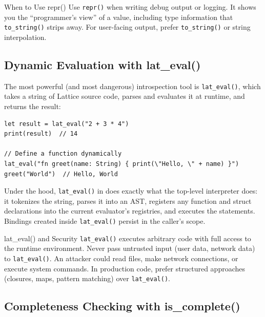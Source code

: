 \begin{tipbox}{When to Use repr()}
Use \lstinline|repr()| when writing debug output or logging.
It shows you the ``programmer's view'' of a value, including type information that \lstinline|to_string()| strips away.
For user-facing output, prefer \lstinline|to_string()| or string interpolation.
\end{tipbox}

\subsection{Dynamic Evaluation with lat\_eval()}


The most powerful (and most dangerous) introspection tool is \lstinline|lat_eval()|, which takes a string of Lattice source code, parses and evaluates it at runtime, and returns the result:

\begin{lstlisting}[language=Lattice, caption={Dynamic code evaluation}]
let result = lat_eval("2 + 3 * 4")
print(result)  // 14

// Define a function dynamically
lat_eval("fn greet(name: String) { print(\"Hello, \" + name) }")
greet("World")  // Hello, World
\end{lstlisting}

Under the hood, \lstinline|lat_eval()| in  does exactly what the top-level interpreter does: it tokenizes the string, parses it into an AST, registers any function and struct declarations into the current evaluator's registries, and executes the statements.
Bindings created inside \lstinline|lat_eval()| persist in the caller's scope.

\begin{warnbox}{lat\_eval() and Security}
\lstinline|lat_eval()| executes arbitrary code with full access to the runtime environment.
Never pass untrusted input (user data, network data) to \lstinline|lat_eval()|.
An attacker could read files, make network connections, or execute system commands.
In production code, prefer structured approaches (closures, maps, pattern matching) over \lstinline|lat_eval()|.
\end{warnbox}

\subsection{Completeness Checking with is\_complete()}

